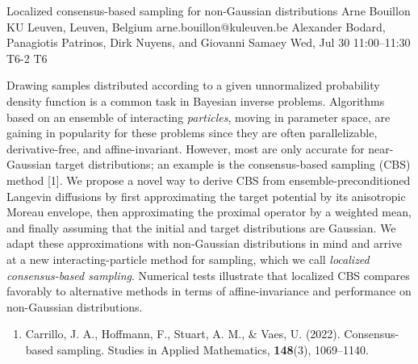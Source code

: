 \documentclass[12pt,lettersize,oneside]{book} %
\begin{document}
\begin{talk}
  {Localized consensus-based sampling for non-Gaussian distributions}%
  {Arne Bouillon}%
  {KU Leuven, Leuven, Belgium}%
  {arne.bouillon@kuleuven.be}%
  {Alexander Bodard, Panagiotis Patrinos, Dirk Nuyens, and Giovanni Samaey}%
  {}%
  {Wed, Jul 30 11:00--11:30}%
  {T6-2}%
  {T6}%
  
    

  Drawing samples distributed according to a given unnormalized probability density function is a common task in Bayesian inverse problems. Algorithms based on an ensemble of interacting \emph{particles}, moving in parameter space, are gaining in popularity for these problems since they are often parallelizable, derivative-free, and affine-invariant. However, most are only accurate for near-Gaussian target distributions; an example is the consensus-based sampling (CBS) method [1]. We propose a novel way to derive CBS from ensemble-preconditioned Langevin diffusions by first approximating the target potential by its anisotropic Moreau envelope, then approximating the proximal operator by a weighted mean, and finally assuming that the initial and target distributions are Gaussian. We adapt these approximations with non-Gaussian distributions in mind and arrive at a new interacting-particle method for sampling, which we call \emph{localized consensus-based sampling}. Numerical tests illustrate that localized CBS compares favorably to alternative methods in terms of affine-invariance and performance on non-Gaussian distributions.
\medskip

\begin{enumerate}
  \item[{[1]}] Carrillo, J. A., Hoffmann, F., Stuart, A. M., \& Vaes, U. (2022). Consensus-based sampling. Studies in Applied Mathematics, \textbf{148}(3), 1069--1140.
\end{enumerate}
\end{talk}
\end{document}
